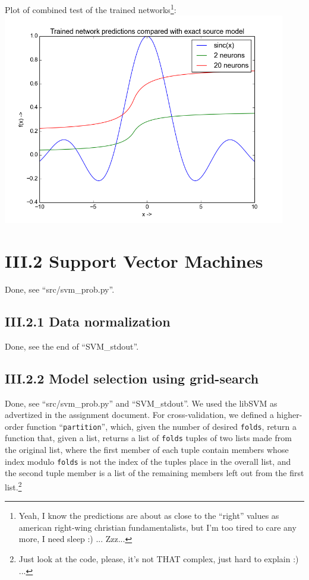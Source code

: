 \documentclass{article}
\theoremstyle{dotless}
\newcounter{min}
\newcommand{\Section}[1]{\section{#1}
\setcounter{min}{1}}
\begin{document}
Plot of combined test of the trained networks\footnote{Yeah, I know the predictions are about as close to the ``right'' values as american right-wing christian fundamentalists, but I'm too tired to care any more, I need sleep :) ... Zzz...}:\\

\includegraphics[keepaspectratio=true, width=350pt]{src/img/nn.png}


\Section{III.2 Support Vector Machines}

Done, see ``src/svm\_prob.py''.

\subsection{III.2.1 Data normalization}

Done, see the end of ``SVM\_stdout''.

\subsection{III.2.2 Model selection using grid-search}

Done, see ``src/svm\_prob.py'' and ``SVM\_stdout''. We used the libSVM as advertized in the assignment document. For cross-validation, we defined a higher-order function ``\texttt{partition}'', which, given the number of desired \texttt{folds}, return a function that, given a list, returns a list of \texttt{folds} tuples of two lists made from the original list, where the first member of each tuple contain members whose index modulo \texttt{folds} is not the index of the tuples place in the overall list, and the second tuple member is a list of the remaining members left out from the first list.\footnote{Just look at the code, please, it's not THAT complex, just hard to explain :) ...}\\
\end{document}
